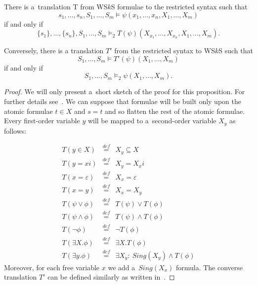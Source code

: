 	\begin{prop}
There is a~translation T from WS$k$S formulae to the restricted syntax such that
\begin{equation}
s_1,\ldots,s_n,S_1,\ldots,S_m \models
\psi(x_1,\ldots,x_n,X_1,\ldots,X_m)
\end{equation} if and only if \begin{equation}\{s_1\},\ldots,\{s_n\},S_1,\ldots,S_m \models_2
T(\psi)(X_{x_1},\ldots,X_{x_n}, X_1,\ldots,X_m).
\end{equation}

 \noindent Conversely, there is a
translation $T'$ from the restricted syntax to WS$k$S such that \begin{equation}S_1,\ldots,S_m
\models T'(\psi)(X_1,\ldots,X_m)\end{equation} if and only if \begin{equation}S_1,\ldots,S_m \models_2
\psi(X_1,\ldots,X_m).\end{equation}
	\end{prop}
	\begin{proof}
We will only present a~short sketch of the proof for this proposition. For
further details see~\cite{tata}.
	\newpage
We can suppose that formulae will be built only upon the atomic formulae $t \in
X$ and $s = t$ and so flatten the rest of the atomic formulae. Every first-order
variable $y$ will be mapped to a~second-order variable $X_y$ as follows:
	
	 \begin{eqnarray}
	 T(y \in X) & \overset{\mathit{def}}{=} & X_y \subseteq X\\
	 T(y = xi) & \overset{\mathit{def}}{=} &  X_y = X_xi\\
	 T(x = \varepsilon) & \overset{\mathit{def}}{=} & X_x = \varepsilon\\
	 T(x = y) & \overset{\mathit{def}}{=} & X_x = X_y\\
	 T(\psi \vee \phi) & \overset{\mathit{def}}{=} & T(\psi) \vee T(\phi)\\
	 T(\psi \wedge \phi) & \overset{\mathit{def}}{=} & T(\psi) \wedge T(\phi)\\
	 T(\neg\phi) & \overset{\mathit{def}}{=} & \neg T(\phi)\\
	 T(\exists X.\phi) & \overset{\mathit{def}}{=} & \exists X.T(\phi)\\
	 T(\exists y.\phi) & \overset{\mathit{def}}{=} & \exists X_y:\ Sing(X_y) \wedge T(\phi)
	 \end{eqnarray}
	Moreover, for each free variable $x$ we add a~$Sing(X_x)$ formula. The converse translation $T'$ can be defined similarly as written
	in~\cite{tata}.
	\end{proof}
	
